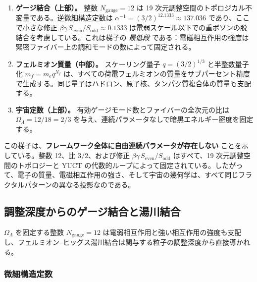 \documentclass[12pt,a4paper]{article}
\begin{document}
	\begin{enumerate}[leftmargin=*]
		\item \textbf{ゲージ結合（上部）。} 整数 \(N_{\mathrm{gauge}} = 12\) は 19 次元調整空間のトポロジカル不変量である。逆微細構造定数は \(\alpha^{-1} = (3/2)^{12.1333} \approx 137.036\) であり、ここで小さな修正 \(\beta\gamma\,S_{\mathrm{even}}/S_{\mathrm{odd}} \approx 0.1333\) は電弱スケール以下での重ボソンの脱結合を考慮している。これは梯子の \emph{最低段} である：電磁相互作用の強度は緊密ファイバー上の調和モードの数によって固定される。
		\item \textbf{フェルミオン質量（中部）。} スケーリング量子 \(q = (3/2)^{1/3}\) と半整数量子化 \(m_f = m_e q^{N_f}\) は、すべての荷電フェルミオンの質量をサブパーセント精度で生成する。同じ量子はハドロン、原子核、タンパク質複合体の質量も支配する。
		\item \textbf{宇宙定数（上部）。} 有効ゲージモード数とファイバーの全次元の比は \(\Omega_\Lambda = 12/18 = 2/3\) を与え、連続パラメータなしで暗黒エネルギー密度を固定する。
	\end{enumerate}
	
	この梯子は、\textbf{フレームワーク全体に自由連続パラメータが存在しない} ことを示している。整数 12、比 \(3/2\)、および修正 \(\beta\gamma\,S_{\mathrm{even}}/S_{\mathrm{odd}}\) はすべて、19 次元調整空間のトポロジーと YUCT の代数的ループによって固定されている。したがって、電子の質量、電磁相互作用の強さ、そして宇宙の幾何学は、すべて同じフラクタルパターンの異なる投影なのである。
	
	\subsection{調整深度からのゲージ結合と湯川結合}
	
	\(\Omega_\Lambda\) を固定する整数 \(N_{\mathrm{gauge}} = 12\) は電弱相互作用と強い相互作用の強度も支配し、フェルミオン–ヒッグス湯川結合は関与する粒子の調整深度から直接導かれる。
	
	\subsubsection{微細構造定数}
	
\end{document}
